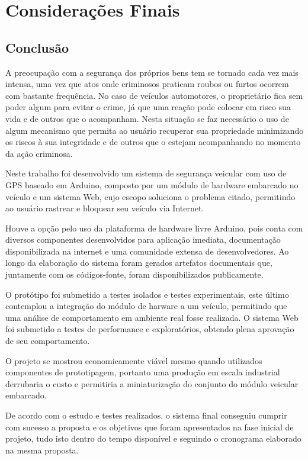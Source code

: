 \chapter{Considera\c{c}\~{o}es Finais}
\label{cap:consideracoes finais}

\section{Conclus\~{a}o}

A preocupação com a segurança dos próprios bens tem se tornado cada vez mais intensa,
uma vez que atos onde criminosos praticam roubos ou furtos ocorrem com bastante
frequência. No caso de veículos automotores, o proprietário fica sem poder algum para
evitar o crime, já que uma reação pode colocar em risco sua vida e de outros que o acompanham.
Nesta situação se faz necessário o uso de algum mecanismo que permita ao
usuário recuperar sua propriedade minimizando os riscos à sua integridade e de outros que
o estejam acompanhando no momento da ação criminosa.

Neste trabalho foi desenvolvido um sistema de segurança veicular com uso de GPS baseado em Arduino, composto por um módulo de hardware embarcado no veículo e um sistema Web, cujo escopo soluciona o problema citado, permitindo ao usuário rastrear e bloquear seu veículo via Internet. 

Houve a opção pelo uso da plataforma de hardware livre Arduino, pois conta com diversos componentes desenvolvidos para aplicação imediata, documentação disponibilizada na internet e uma comunidade extensa de desenvolvedores. Ao longo da elaboração do sistema foram gerados artefatos documentais que, juntamente com os códigos-fonte, foram disponibilizados publicamente.

O protótipo foi submetido a testes isolados e testes experimentais, este último contemplou a integração do módulo de harware a um veículo, permitindo que uma análise de comportamento em ambiente real fosse realizada. O sistema Web foi submetido a testes de performance e exploratórios, obtendo plena aprovação de seu comportamento.  

O projeto se mostrou economicamente viável mesmo quando utilizados componentes de prototipagem, portanto uma produção em escala industrial derrubaria o custo e permitiria a miniaturização do conjunto do módulo veicular embarcado.

De acordo com o estudo e testes realizados, o sistema final conseguiu cumprir com sucesso a proposta e os objetivos que foram apresentados na fase inicial de projeto, tudo isto dentro do tempo disponível e seguindo o cronograma elaborado na mesma proposta.
 

